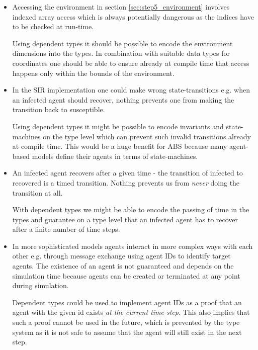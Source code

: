\begin{itemize}
	\item Accessing the environment in section \ref{sec:step5_environment} involves indexed array access which is always potentially dangerous as the indices have to be checked at run-time. 
	
	Using dependent types it should be possible to encode the environment dimensions into the types. In combination with suitable data types for coordinates one should be able to ensure already at compile time that access happens only within the bounds of the environment.
	
	\item In the SIR implementation one could make wrong state-transitions e.g. when an infected agent should recover, nothing prevents one from making the transition back to susceptible. 
	
	Using dependent types it might be possible to encode invariants and state-machines on the type level which can prevent such invalid transitions already at compile time. This would be a huge benefit for ABS because many agent-based models define their agents in terms of state-machines.
	
	\item An infected agent recovers after a given time - the transition of infected to recovered is a timed transition. Nothing prevents us from \textit{never} doing the transition at all. 
	
	With dependent types we might be able to encode the passing of time in the types and guarantee on a type level that an infected agent has to recover after a finite number of time steps.
	
	\item In more sophisticated models agents interact in more complex ways with each other e.g. through message exchange using agent IDs to identify target agents. The existence of an agent is not guaranteed and depends on the simulation time because agents can be created or terminated at any point during simulation. 
	
	Dependent types could be used to implement agent IDs as a proof that an agent with the given id exists \textit{at the current time-step}. This also implies that such a proof cannot be used in the future, which is prevented by the type system as it is not safe to assume that the agent will still exist in the next step.
	

\end{itemize}
